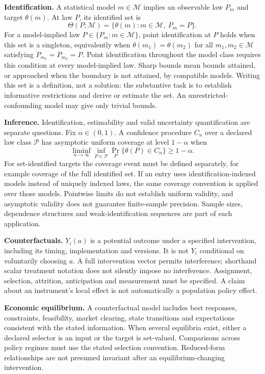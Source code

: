 \documentclass[11pt,a4paper]{article}
\begin{document}
\textbf{Identification.} A statistical model $m\in\mathcal M$ implies an observable law $P_m$ and target $\theta(m)$. At law $P$, its identified set is
\[
\Theta(P;\mathcal M)=\{\theta(m):m\in\mathcal M,\ P_m=P\}.
\]
For a model-implied law $P\in\{P_m:m\in\mathcal M\}$, point identification at $P$ holds when this set is a singleton, equivalently when $\theta(m_1)=\theta(m_2)$ for all $m_1,m_2\in\mathcal M$ satisfying $P_{m_1}=P_{m_2}=P$. Point identification throughout the model class requires this condition at every model-implied law. Sharp bounds mean bounds attained, or approached when the boundary is not attained, by compatible models. Writing this set is a definition, not a solution: the substantive task is to establish informative restrictions and derive or estimate the set. An unrestricted-confounding model may give only trivial bounds.

\textbf{Inference.} Identification, estimability and valid uncertainty quantification are separate questions. Fix $\alpha\in(0,1)$. A confidence procedure $C_n$ over a declared law class $\mathcal P$ has asymptotic uniform coverage at level $1-\alpha$ when
\[
\liminf_{n\to\infty}\inf_{P\in\mathcal P}\Pr_P\{\theta(P)\in C_n\}\geq1-\alpha.
\]
For set-identified targets the coverage event must be defined separately, for example coverage of the full identified set. If an entry uses identification-indexed models instead of uniquely indexed laws, the same coverage convention is applied over those models. Pointwise limits do not establish uniform validity, and asymptotic validity does not guarantee finite-sample precision. Sample sizes, dependence structures and weak-identification sequences are part of each application.

\textbf{Counterfactuals.} $Y_i(a)$ is a potential outcome under a specified intervention, including its timing, implementation and versions. It is not $Y_i$ conditional on voluntarily choosing $a$. A full intervention vector permits interference; shorthand scalar treatment notation does not silently impose no interference. Assignment, selection, attrition, anticipation and measurement must be specified. A claim about an instrument's local effect is not automatically a population policy effect.

\textbf{Economic equilibrium.} A counterfactual model includes best responses, constraints, feasibility, market clearing, state transitions and expectations consistent with the stated information. When several equilibria exist, either a declared selector is an input or the target is set-valued. Comparisons across policy regimes must use the stated selection convention. Reduced-form relationships are not presumed invariant after an equilibrium-changing intervention.
\end{document}
